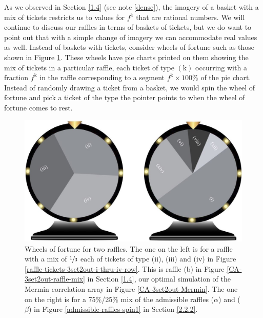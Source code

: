 As we observed in Section \ref{1.4} (see note \ref{dense}), the imagery of a basket with a mix of tickets restricts us to values for $f^{\mathrm{k}}$ that are rational numbers. We will continue to discuss our raffles in terms of baskets of tickets, but we do want to point out that with a simple change of imagery we can accommodate real values as well. Instead of  baskets with tickets, consider wheels of fortune such as those shown in Figure \ref{wheelsoffortune}. These wheels have pie charts printed on them showing the mix of tickets in a particular raffle, each ticket of type $(\mathrm{k})$ occurring with a fraction $f^{\mathrm{k}}$ in the raffle corresponding to a segment $f^{\mathrm{k}} \times 100\%$ of the pie chart. Instead of randomly drawing a ticket from a basket, we would spin the wheel of fortune and pick a ticket of the type the pointer points to when the wheel of fortune comes to rest.   
          
\begin{figure}[ht]
 \centering
   \includegraphics[width=4.5in]{wheelsoffortune.jpeg} 
   \caption{Wheels of fortune for two raffles. The one on the left is for a raffle with a mix of $\sfrac13$ each of tickets of type (ii), (iii) and (iv) in Figure \ref{raffle-tickets-3set2out-i-thru-iv-row}. This is raffle (b) in Figure \ref{CA-3set2out-raffle-mix} in Section \ref{1.4}, our optimal simulation of the Mermin correlation array in Figure \ref{CA-3set2out-Mermin}. The one on the right is for a 75\%/25\% mix of the admissible raffles ($\alpha$) and ($\beta$) in Figure \ref{admissible-raffles-spin1} in Section \ref{2.2.2}.}
   \label{wheelsoffortune}
   \end{figure}  

